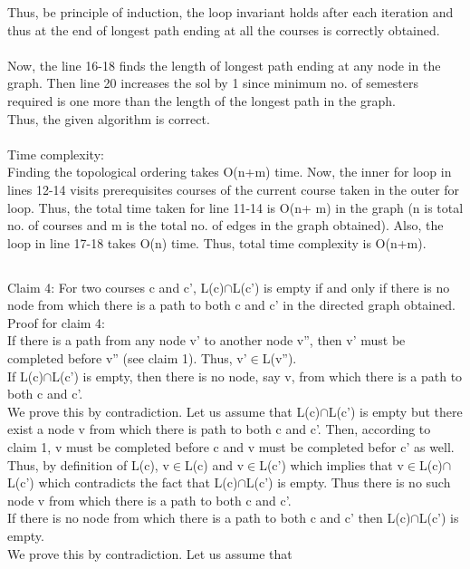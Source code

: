 \documentclass{article}
\begin{document}
Thus, be principle of induction, the loop invariant holds after each iteration and thus at the end of longest path ending at all the courses is correctly obtained.\\
\\
Now, the line 16-18 finds the length of longest path ending at any node in the graph. Then line 20 increases the sol by 1 since minimum no. of semesters required is one more than the length of the longest path in the graph.\\
Thus, the given algorithm is correct.\\
\\
Time complexity:\\
Finding the topological ordering takes O(n+m) time. Now, the inner for loop in lines 12-14 visits prerequisites courses of the current course taken in the outer for loop. Thus, the total time taken for line 11-14 is O(n+ m) in the graph (n is total no. of courses and m is the total no. of edges in the graph obtained). Also, the loop in line 17-18 takes O(n) time. Thus, total time complexity is O(n+m).
\subsection{}
Claim 4: For two courses c and c', L(c)$\cap$L(c') is empty if and only if there is no node from which there is a path to both c and c' in the directed graph obtained.\\
Proof for claim 4:\\
If there is a path from any node v' to another node v'', then v' must be completed before v'' (see claim 1). Thus, v'$\in$L(v'').\\
If L(c)$\cap$L(c') is empty, then there is no node, say v, from which there is a path to both c and c'.\\
We prove this by contradiction. Let us assume that L(c)$\cap$L(c') is empty but there exist a node v from which there is path to both c and c'. Then, according to claim 1, v must be completed before c and v must be completed befor c' as well. Thus, by definition of L(c), v$\in$L(c) and v$\in$L(c') which implies that v$\in$L(c)$\cap$L(c') which contradicts the fact that L(c)$\cap$L(c') is empty. Thus there is no such node v from which there is a path to both c and c'.\\
If there is no node from which there is a path to both c and c' then L(c)$\cap$L(c') is empty.\\
We prove this by contradiction. Let us assume that 
\end{document}
